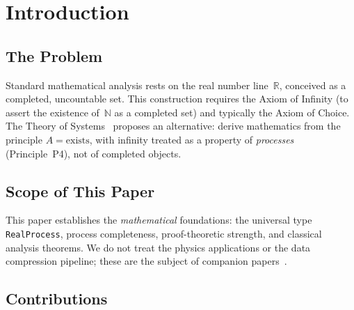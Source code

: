 \documentclass[11pt,a4paper]{article}
\theoremstyle{definition}
\theoremstyle{remark}
\newcommand{\RP}{\texttt{RealProcess}}
\begin{document}
\tableofcontents
\newpage

\section{Introduction}
\label{sec:intro}

\subsection{The Problem}

Standard mathematical analysis rests on the real number line~$\mathbb{R}$, conceived as a completed, uncountable set.  This construction requires the Axiom of Infinity (to assert the existence of~$\mathbb{N}$ as a completed set) and typically the Axiom of Choice.  The Theory of Systems~\cite{tos2025} proposes an alternative: derive mathematics from the principle $A = \text{exists}$, with infinity treated as a property of \emph{processes} (Principle~P4), not of completed objects.

\subsection{Scope of This Paper}

This paper establishes the \emph{mathematical} foundations: the universal type \RP{}, process completeness, proof-theoretic strength, and classical analysis theorems.  We do not treat the physics applications or the data compression pipeline; these are the subject of companion papers~\cite{physics_paper,compression_paper}.

\subsection{Contributions}
\end{document}
